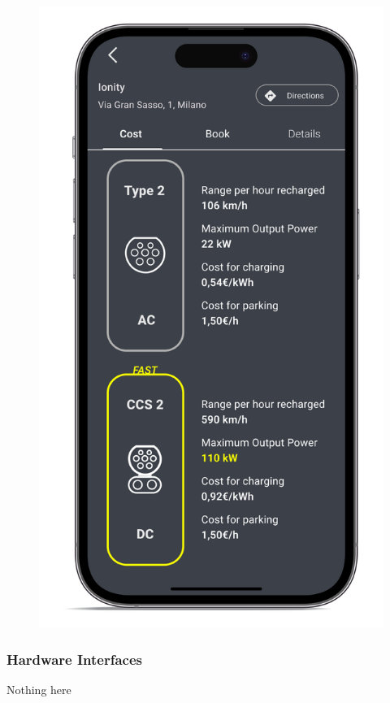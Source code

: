 \begin{figure}[H]
    \centering
    \includegraphics[scale=0.1]{src/mockups/book_cost.png}
\end{figure} \vspace{1cm}

\subsubsection{Hardware Interfaces}
Nothing here

